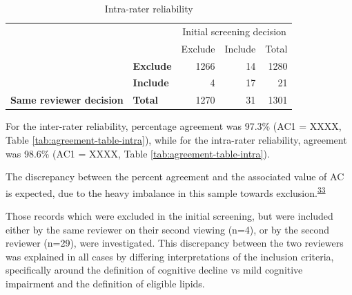 \documentclass[a4paper, twoside]{templates/ociamthesis}
\begin{document}
\begin{table}

\caption{\label{tab:agreementtableintra}Intra-rater reliability}
\centering
\begin{tabular}[t]{>{}l>{}l|r>{}r|r}
\toprule
\multicolumn{2}{c}{ } & \multicolumn{3}{c}{Initial screening decision} \\
\cmidrule(l{3pt}r{3pt}){3-5}
 &  & Exclude & Include & Total\\
\midrule
 & \textbf{Exclude} & 1266 & 14 & 1280\\
\cmidrule{2-5}
 & \textbf{Include} & 4 & 17 & 21\\
\cmidrule{2-5}
\multirow{-3}{*}{\raggedright\arraybackslash \textbf{Same reviewer decision}} & \textbf{Total} & 1270 & 31 & 1301\\
\bottomrule
\end{tabular}
\end{table}

For the inter-rater reliability, percentage agreement was 97.3\% (AC1 = XXXX, Table \ref{tab:agreement-table-intra}), while for the intra-rater reliability, agreement was 98.6\% (AC1 = XXXX, Table \ref{tab:agreement-table-intra}).

The discrepancy between the percent agreement and the associated value of AC is expected, due to the heavy imbalance in this sample towards exclusion.\textsuperscript{\protect\hyperlink{ref-feinstein1990}{33}}

Those records which were excluded in the initial screening, but were included either by the same reviewer on their second viewing (n=4), or by the second reviewer (n=29), were investigated. This discrepancy between the two reviewers was explained in all cases by differing interpretations of the inclusion criteria, specifically around the definition of cognitive decline vs mild cognitive impairment and the definition of eligible lipids.
\end{document}
